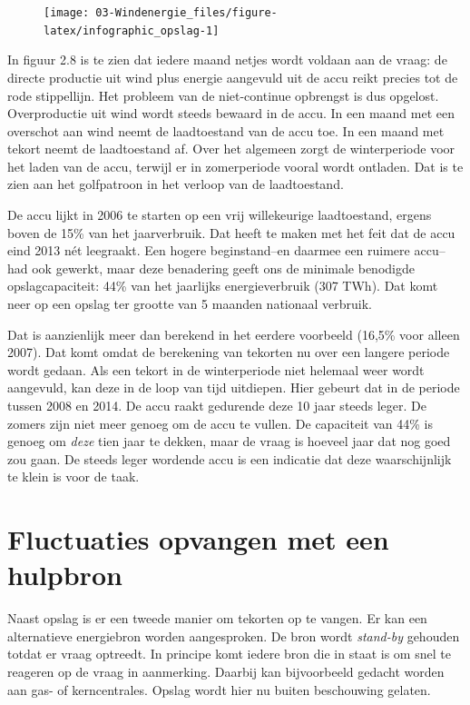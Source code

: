 \documentclass[
  11pt,
  a4paper,
]{book}
\begin{document}
\begin{figure}[!t]

{\centering \texttt{[image: 03-Windenergie\_files/figure-latex/infographic\_opslag-1]} 

}

\end{figure}

\noindent
In figuur 2.8 is te zien dat iedere maand netjes wordt voldaan aan de vraag: de directe productie uit wind plus energie aangevuld uit de accu reikt precies tot de rode stippellijn. Het probleem van de niet-continue opbrengst is dus opgelost. Overproductie uit wind wordt steeds bewaard in de accu. In een maand met een overschot aan wind neemt de laadtoestand van de accu toe. In een maand met tekort neemt de laadtoestand af. Over het algemeen zorgt de winterperiode voor het laden van de accu, terwijl er in zomerperiode vooral wordt ontladen. Dat is te zien aan het golfpatroon in het verloop van de laadtoestand.

De accu lijkt in 2006 te starten op een vrij willekeurige laadtoestand, ergens boven de 15\% van het jaarverbruik. Dat heeft te maken met het feit dat de accu eind 2013 nét leegraakt. Een hogere beginstand--en daarmee een ruimere accu--had ook gewerkt, maar deze benadering geeft ons de minimale benodigde opslagcapaciteit: 44\% van het jaarlijks energieverbruik (307 TWh). Dat komt neer op een opslag ter grootte van 5 maanden nationaal verbruik.

Dat is aanzienlijk meer dan berekend in het eerdere voorbeeld (16,5\% voor alleen 2007). Dat komt omdat de berekening van tekorten nu over een langere periode wordt gedaan. Als een tekort in de winterperiode niet helemaal weer wordt aangevuld, kan deze in de loop van tijd uitdiepen. Hier gebeurt dat in de periode tussen 2008 en 2014. De accu raakt gedurende deze 10 jaar steeds leger. De zomers zijn niet meer genoeg om de accu te vullen. De capaciteit van 44\% is genoeg om \emph{deze} tien jaar te dekken, maar de vraag is hoeveel jaar dat nog goed zou gaan. De steeds leger wordende accu is een indicatie dat deze waarschijnlijk te klein is voor de taak.

\hypertarget{fluctuaties-opvangen-met-een-hulpbron}{%
\section{Fluctuaties opvangen met een hulpbron}\label{fluctuaties-opvangen-met-een-hulpbron}}

Naast opslag is er een tweede manier om tekorten op te vangen. Er kan een alternatieve energiebron worden aangesproken. De bron wordt \emph{stand-by} gehouden totdat er vraag optreedt. In principe komt iedere bron die in staat is om snel te reageren op de vraag in aanmerking. Daarbij kan bijvoorbeeld gedacht worden aan gas- of kerncentrales. Opslag wordt hier nu buiten beschouwing gelaten.
\end{document}
